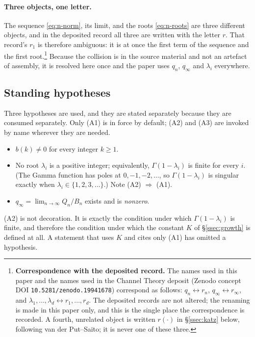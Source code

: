 \paragraph{Three objects, one letter.}
The sequence \eqref{eq:n-norm}, its limit, and the roots \eqref{eq:n-roots} are
three different objects, and in the deposited record all three are written with
the letter $r$. That record's $r_1$ is therefore ambiguous: it is at once the
first term of the sequence and the first root.\footnote{%
  \textbf{Correspondence with the deposited record.} The names used in this
  paper and the names used in the Channel Theory deposit (Zenodo concept DOI
  \texttt{10.5281/zenodo.19941678}) correspond as follows:
  $q_n\leftrightarrow r_n$, $q_\infty\leftrightarrow r_\infty$, and
  $\lambda_1,\dots,\lambda_d\leftrightarrow r_1,\dots,r_d$. The deposited
  records are not altered; the renaming is made in this paper only, and this is
  the single place the correspondence is recorded. A fourth, unrelated object
  is written $r(\cdot)$ in \S\ref{ssec:katz} below, following van der
  Put--Saito; it is never one of these three.}
Because the collision is in the source material and not an artefact of
assembly, it is resolved here once and the paper uses $q_n$, $q_\infty$ and
$\lambda_i$ everywhere.

\subsection{Standing hypotheses}\label{ssec:hypotheses}

Three hypotheses are used, and they are stated separately because they are
consumed separately. Only (A1) is in force by default; (A2) and (A3) are
invoked by name wherever they are needed.

\begin{itemize}
\item[\textbf{(A1)}] $b(k)\neq0$ for every integer $k\ge1$.
\item[\textbf{(A2)}] No root $\lambda_i$ is a positive integer; equivalently,
  $\Gamma(1-\lambda_i)$ is finite for every $i$. (The Gamma function has poles
  at $0,-1,-2,\dots$, so $\Gamma(1-\lambda_i)$ is singular exactly when
  $\lambda_i\in\{1,2,3,\dots\}$.) Note (A2) $\Rightarrow$ (A1).
\item[\textbf{(A3)}] $q_\infty=\lim_{n\to\infty}Q_n/B_n$ exists and is
  \emph{nonzero}.
\end{itemize}

(A2) is not decoration. It is exactly the condition under which
$\Gamma(1-\lambda_i)$ is finite, and therefore the condition under which the
constant $K$ of \S\ref{ssec:growth} is defined at all. A statement that uses
$K$ and cites only (A1) has omitted a hypothesis.

